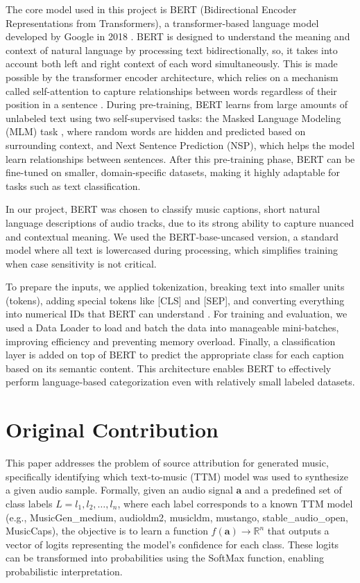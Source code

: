 \documentclass[conference]{IEEEtran}  %
\begin{document}
The core model used in this project is BERT (Bidirectional Encoder Representations from Transformers), a transformer-based language model developed by Google in 2018 \cite{wang2019structbert}. BERT is designed to understand the meaning and context of natural language by processing text bidirectionally, so, it takes into account both left and right context of each word simultaneously. This is made possible by the transformer encoder architecture, which relies on a mechanism called self-attention to capture relationships between words regardless of their position in a sentence \cite{vaswani2023attentionneed, wolf2020transformers}. During pre-training, BERT learns from large amounts of unlabeled text using two self-supervised tasks: the Masked Language Modeling (MLM) task \cite{devlin2019bert}, where random words are hidden and predicted based on surrounding context, and Next Sentence Prediction (NSP), which helps the model learn relationships between sentences. After this pre-training phase, BERT can be fine-tuned on smaller, domain-specific datasets, making it highly adaptable for tasks such as text classification.

In our project, BERT was chosen to classify music captions, short natural language descriptions of audio tracks, due to its strong ability to capture nuanced and contextual meaning. We used the BERT-base-uncased version, a standard model where all text is lowercased during processing, which simplifies training when case sensitivity is not critical. 

To prepare the inputs, we applied tokenization, breaking text into smaller units (tokens), adding special tokens like [CLS] and [SEP], and converting everything into numerical IDs that BERT can understand \cite{wolf2020transformers}. For training and evaluation, we used a Data Loader to load and batch the data into manageable mini-batches, improving efficiency and preventing memory overload. Finally, a classification layer is added on top of BERT to predict the appropriate class for each caption based on its semantic content. This architecture enables BERT to effectively perform language-based categorization even with relatively small labeled datasets.

\section{Original Contribution}

This paper addresses the problem of source attribution for generated music, specifically identifying which text-to-music (TTM) model was used to synthesize a given audio sample. Formally, given an audio signal $\mathbf{a}$ and a predefined set of class labels $L = {l_1, l_2, \dots, l_n}$, where each label corresponds to a known TTM model (e.g., MusicGen\_medium, audioldm2, musicldm, mustango, stable\_audio\_open, MusicCaps), the objective is to learn a function $f(\mathbf{a}) \rightarrow \mathbb{R}^n$ that outputs a vector of logits representing the model’s confidence for each class. These logits can be transformed into probabilities using the SoftMax function, enabling probabilistic interpretation.
\end{document}
